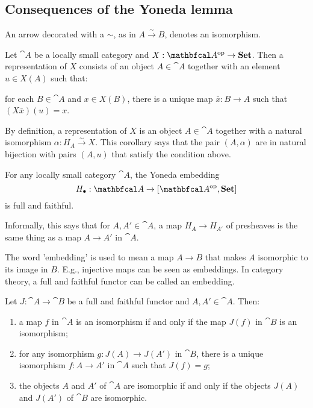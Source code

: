 \subsection{Consequences of the Yoneda lemma}

\begin{notation}
    An arrow decorated with a $\sim$, as in $A\xrightarrow{\sim}B$, denotes an isomorphism.
\end{notation}

\begin{corollary}
    Let $\cat{A}$ be a locally small category and $X:\catop{A}\to\bcat{Set}$. Then a representation of $X$ consists of an object $A\in\cat{A}$ together with an element $u\in X(A)$ such that:\par
\quad for each $B\in\cat{A}$ and $x\in X(B)$, there is a unique map $\bar{x}:B\to A$ such that $(X\bar{x})(u)=x$.
\end{corollary}
By definition, a representation of $X$ is an object $A\in\cat{A}$ together with a natural isomorphism $\alpha: H_A\xrightarrow{\sim}X$. This corollary says that the pair $(A,\alpha)$ are in natural bijection with pairs $(A,u)$ that satisfy the condition above.

\begin{corollary}
    For any locally small category $\cat{A}$, the Yoneda embedding
    \begin{equation*}
        H_{\bullet}: \cat{A}\to[\catop{A}, \bcat{Set}]
    \end{equation*}
    is full and faithful.
\end{corollary}
Informally, this says that for $A,A'\in\cat{A}$, a map $H_A\to H_{A'}$ of presheaves is the same thing as a map $A\to A'$ in $\cat{A}$.\par

The word 'embedding' is used to mean a map $A\to B$ that makes $A$ isomorphic to its image in $B$. E.g., injective maps can be seen as embeddings. In category theory, a full and faithful functor can be called an embedding.

\begin{lemma}
    Let $J:\cat{A}\to\cat{B}$ be a full and faithful functor and $A,A'\in\cat{A}$. Then:
    \begin{enumerate}[label=(\alph*)]
        \item a map $f$ in $\cat{A}$ is an isomorphism if and only if the map $J(f)$ in $\cat{B}$ is an isomorphism;
        \item for any isomorphism $g:J(A)\to J(A')$ in $\cat{B}$, there is a unique isomorphism $f:A\to A'$ in $\cat{A}$ such that $J(f)=g$;
        \item the objects $A$ and $A'$ of $\cat{A}$ are isomorphic if and only if the objects $J(A)$ and $J(A')$ of $\cat{B}$ are isomorphic.
    \end{enumerate}
\end{lemma}
